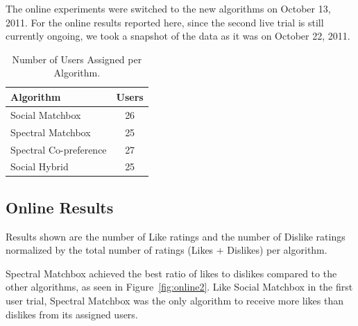 The online experiments were switched to the new algorithms on October 13, 2011. For the online results reported here, since the second live trial is still currently ongoing, we took a snapshot of the data as it was on October 22, 2011.

\begin{table}[h!]
\centering
\begin{tabular}{| l | c |}
\hline
{\bf Algorithm} & {\bf Users} \\
\hline
Social Matchbox & 26\\
Spectral Matchbox  & 25 \\
Spectral Co-preference & 27 \\
Social Hybrid & 25 \\
\hline
\end{tabular}
\caption{Number of Users Assigned per Algorithm.}
\label{tab:assigned2}
\end{table}

\subsection{Online Results}

Results shown are the number of Like ratings and the number of Dislike ratings normalized by the total number of ratings (Likes + Dislikes) per algorithm. 

Spectral Matchbox achieved the best ratio of likes to dislikes compared to the other algorithms, as seen in Figure~\ref{fig:online2}. Like Social Matchbox in the first user trial, Spectral Matchbox was the only algorithm to receive more likes than dislikes from its assigned users.

